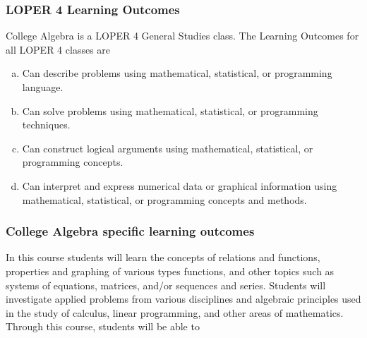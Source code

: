 \documentclass[12pt]{article}
\newcounter{on}\setcounter{on}{0}
\newcounter{ex}\setcounter{ex}{0}
\newenvironment{alphalist}{
  \begin{enumerate}[(a)]
    \addtolength{\itemsep}{-0.75\itemsep}}
  {\end{enumerate}}
\begin{document}
\subsubsection*{LOPER 4 Learning Outcomes}

College Algebra is a LOPER 4 General Studies class. The Learning Outcomes for
all  LOPER 4 classes are
\begin{alphalist}
\item Can describe problems using mathematical, statistical, or programming language.
\item Can solve problems using mathematical, statistical, or programming techniques.
\item Can construct logical arguments using mathematical, statistical, or programming concepts.
\item Can interpret and express numerical data or graphical information using 
   mathematical, statistical, or programming concepts and methods.
\end{alphalist}


\subsubsection{College Algebra specific learning outcomes} 

In this course students will learn the concepts of relations and 
functions, properties and graphing of various types functions, and other topics such 
as systems of equations, matrices, and/or sequences and series. Students will 
investigate applied problems from various disciplines and 
algebraic principles used in the study of calculus, linear programming, and other 
areas of mathematics. Through this course, students will be able to
\end{document}

